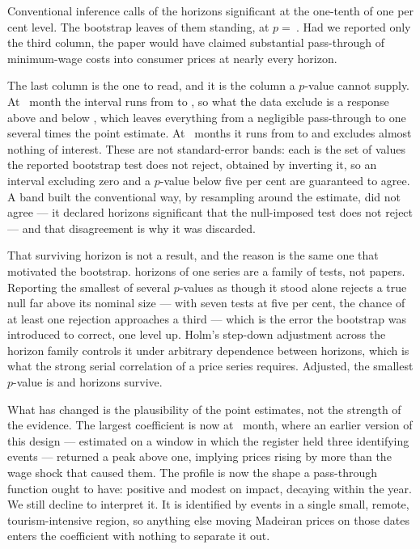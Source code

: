 Conventional inference calls \ClusteredHighlySignificant{} of the
\HorizonsEstimated{} horizons significant at the one-tenth of one per cent
level. The bootstrap leaves \BootstrapSurvivors{} of them standing, at
$p =\ $\MinBootstrapP{}. Had we reported only the third column, the paper would
have claimed substantial pass-through of minimum-wage costs into consumer prices
at nearly every horizon.

The last column is the one to read, and it is the column a $p$-value cannot
supply. At \PeakHorizon{}~month the interval runs from \PeakIntervalLower{} to
\PeakIntervalUpper{}, so what the data exclude is a response above
\PeakIntervalUpper{} and below \PeakIntervalLower{}, which leaves everything
from a negligible pass-through to one several times the point estimate. At
\WidestIntervalHorizon{}~months it runs from \WidestIntervalLower{} to
\WidestIntervalUpper{} and excludes almost nothing of interest. These are not
standard-error bands: each is the set of values the reported bootstrap test does
not reject, obtained by inverting it, so an interval excluding zero and a
$p$-value below five per cent are guaranteed to agree. A band built the
conventional way, by resampling around the estimate, did not agree --- it
declared horizons significant that the null-imposed test does not reject --- and
that disagreement is why it was discarded.

That surviving horizon is not a result, and the reason is the same one that
motivated the bootstrap. \HorizonsEstimated{} horizons of one series are a
family of tests, not \HorizonsEstimated{} papers. Reporting the smallest of
several $p$-values as though it stood alone rejects a true null far above its
nominal size --- with seven tests at five per cent, the chance of at least one
rejection approaches a third --- which is the error the bootstrap was introduced
to correct, one level up. Holm's step-down adjustment across the horizon family
controls it under arbitrary dependence between horizons, which is what the
strong serial correlation of a price series requires. Adjusted, the smallest
$p$-value is \MinBootstrapHolmP{} and \BootstrapSurvivorsHolm{} horizons
survive.

What has changed is the plausibility of the point estimates, not the strength of
the evidence. The largest coefficient is now \PeakCoefficient{} at
\PeakHorizon{}~month, where an earlier version of this design --- estimated on a
window in which the register held three identifying events --- returned a peak
above one, implying prices rising by more than the wage shock that caused them.
The profile is now the shape a pass-through function ought to have: positive and
modest on impact, decaying within the year. We still decline to interpret it. It
is identified by \IdentifyingEvents{} events in a single small, remote,
tourism-intensive region, so anything else moving Madeiran prices on those dates
enters the coefficient with nothing to separate it out.

